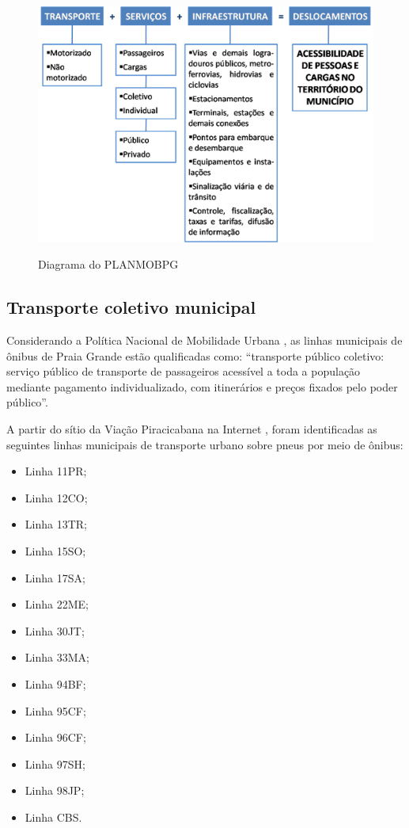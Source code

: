 	\begin{figure}[h]
		\centering
		\caption{Diagrama do PLANMOBPG}
		\includegraphics[width=1\textwidth]{img/planmob_apresentacao.png}
		\label{diagrama_planmob}
	\end{figure}
	
	\subsection{Transporte coletivo municipal}
	
	Considerando a Política Nacional de Mobilidade Urbana \cite[Art. 4\textordmasculine, inciso VI]{gf2012a}, as linhas municipais de ônibus de Praia Grande estão qualificadas como: ``transporte público coletivo: serviço público de transporte de passageiros acessível a toda a população mediante pagamento individualizado, com itinerários e preços fixados pelo poder público''.
	
	A partir do sítio da Viação Piracicabana na Internet \cite{piracicabana2017a}, foram identificadas as seguintes linhas municipais de transporte urbano sobre pneus por meio de ônibus:
	
	\begin{itemize}
		\item Linha 11PR;
		\item Linha 12CO;
		\item Linha 13TR;
		\item Linha 15SO;
		\item Linha 17SA;
		\item Linha 22ME;
		\item Linha 30JT;
		\item Linha 33MA;
		\item Linha 94BF;
		\item Linha 95CF;
		\item Linha 96CF;
		\item Linha 97SH;
		\item Linha 98JP;
		\item Linha CBS.
	\end{itemize}

